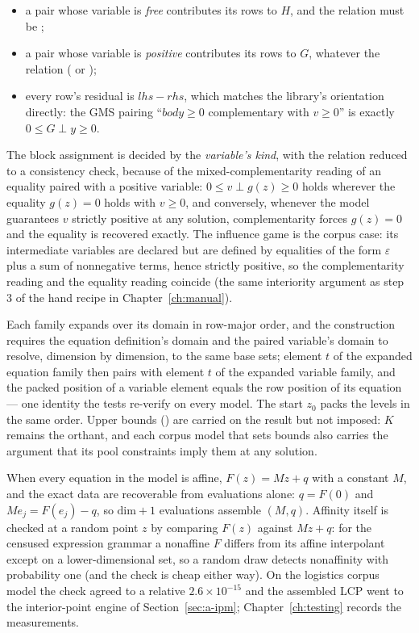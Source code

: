 \begin{itemize}
\item a pair whose variable is \emph{free} contributes its rows to $H$,
  and the relation must be ;
\item a pair whose variable is \emph{positive} contributes its rows to
  $G$, whatever the relation ( or );
\item every row's residual is $\mathit{lhs} - \mathit{rhs}$, which
  matches the library's orientation directly: the GMS pairing
  ``$\mathit{body} \geq 0$ complementary with $v \geq 0$'' is exactly
  $0 \leq G \perp y \geq 0$.
\end{itemize}

The block assignment is decided by the \emph{variable's kind}, with the
relation reduced to a consistency check, because of the
mixed-complementarity reading of an equality paired with a positive
variable: $0 \leq v \perp g(z) \geq 0$ holds wherever the equality
$g(z) = 0$ holds with $v \geq 0$, and conversely, whenever the model
guarantees $v$ strictly positive at any solution, complementarity forces
$g(z) = 0$ and the equality is recovered exactly. The influence game is
the corpus case: its intermediate variables are declared
 but are defined by equalities of the form
$\varepsilon$ plus a sum of nonnegative terms, hence strictly positive,
so the complementarity reading and the equality reading coincide (the
same interiority argument as step 3 of the hand recipe in
Chapter~\ref{ch:manual}).

Each family expands over its domain in row-major order, and the
construction requires the equation definition's domain and the paired
variable's domain to resolve, dimension by dimension, to the same base
sets; element $t$ of the expanded equation family then pairs with element
$t$ of the expanded variable family, and the packed position of a
variable element equals the row position of its equation --- one identity
the tests re-verify on every model. The start $z_0$ packs the 
levels in the same order. Upper bounds () are carried on the
result but not imposed: $K$ remains the orthant, and each corpus model
that sets bounds also carries the argument that its pool constraints
imply them at any solution.

When every equation in the model is affine, $F(z) = Mz + q$ with a
constant $M$, and the exact data are recoverable from evaluations alone:
$q = F(0)$ and $M e_j = F(e_j) - q$, so $\mathrm{dim}+1$ evaluations
assemble $(M, q)$. Affinity itself is checked at a random point $z$ by
comparing $F(z)$ against $Mz + q$: for the censused expression grammar a
nonaffine $F$ differs from its affine interpolant except on a
lower-dimensional set, so a random draw detects nonaffinity with
probability one (and the check is cheap either way). On the logistics
corpus model the check agreed to a relative $2.6\times 10^{-15}$ and the
assembled LCP went to the interior-point engine of
Section~\ref{sec:a-ipm}; Chapter~\ref{ch:testing} records the
measurements.

